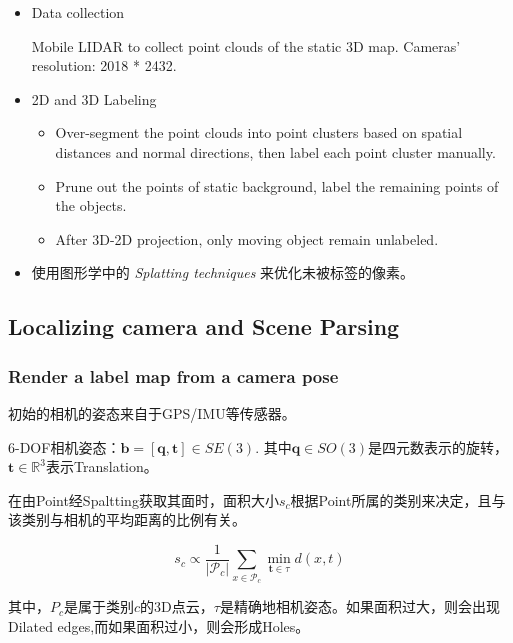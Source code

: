 \begin{itemize}
\item Data collection

Mobile LIDAR to collect point clouds of the static 3D map. Cameras' resolution: 2018 * 2432.

\item 2D and 3D Labeling

\begin{itemize}
\item Over-segment the point clouds into point clusters based on spatial distances and normal directions, then label each point cluster manually.

\item Prune out the points of static background, label the remaining points of the objects.

\item After 3D-2D projection, only moving object remain unlabeled.

\end{itemize}

\item 使用图形学中的 \textit{Splatting techniques} 来优化未被标签的像素。

\end{itemize}

\subsection{Localizing camera and Scene Parsing}

\subsubsection{Render a label map from a camera pose}

初始的相机的姿态来自于GPS/IMU等传感器。

6-DOF相机姿态：$\mathbf{b} = [\mathbf{q}, \mathbf{t}] \in SE(3)$. 其中$\mathbf{q} \in SO(3)$是四元数表示的旋转，$\mathbf{t} \in \mathbb{R}^3$表示Translation。

在由Point经Spaltting获取其面时，面积大小$s_c$根据Point所属的类别来决定，且与该类别与相机的平均距离的比例有关。

\begin{displaymath}
s_c \propto \frac{1}{|\mathcal{P}_c|}\sum_{x \in \mathcal{P}_c}\min_{\mathbf{t}\in \tau}d(x, t)
\end{displaymath}

其中，$P_c$是属于类别$c$的3D点云，$\tau$是精确地相机姿态。如果面积过大，则会出现Dilated edges,而如果面积过小，则会形成Holes。

